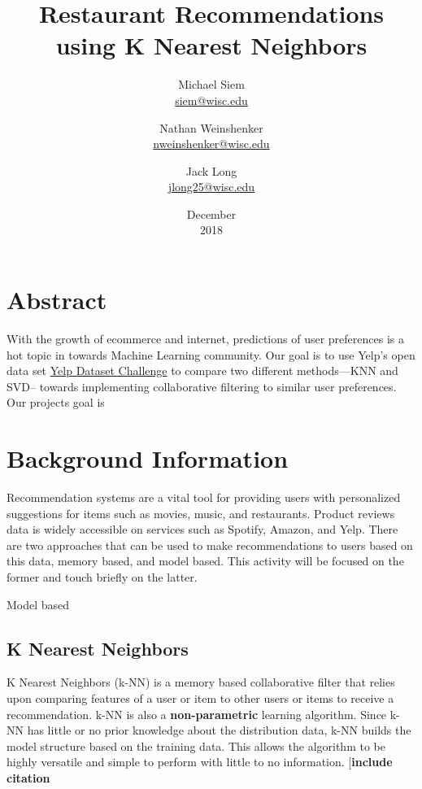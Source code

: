 \documentclass{report}
\title{Restaurant Recommendations using K Nearest Neighbors}
\date{December\\ 2018}
\author{Michael Siem \\ \href{mailto:siem@wisc.edu}{siem@wisc.edu}
	\and Nathan Weinshenker \\ \href{mailto:nweinshenker@wisc.edu}{nweinshenker@wisc.edu}
	\and Jack Long \\ \href{mailto:jlong25@wisc.edu}{jlong25@wisc.edu}}
\begin{document}
\maketitle

\section*{Abstract}
With the growth of ecommerce and internet, predictions of user preferences is a hot topic in towards Machine Learning community. Our goal is to use Yelp's open data set \href {https://www.yelp.com/dataset/challenge} {Yelp Dataset Challenge} to compare two different methods—KNN and SVD-- towards implementing collaborative filtering to similar user preferences.  Our projects goal is 


\section*{Background Information}

Recommendation systems are a vital tool for providing users with personalized suggestions for items such as movies, music, and restaurants.
Product reviews data is widely accessible on services such as Spotify, Amazon, and Yelp.
There are two approaches that can be used to make recommendations to users based on this data, memory based, and model based. This activity will be focused on the former and touch briefly on the latter.

Model based 
	
\subsection*{K Nearest Neighbors}
	
K Nearest Neighbors (k-NN) is a memory based collaborative filter that relies upon comparing features of a user or item to other users or items to receive a recommendation. 
k-NN is also a \textbf{non-parametric} learning algorithm. Since k-NN has little or no prior knowledge about the distribution data, k-NN  builds the model structure based on the training data. This allows the algorithm to be highly versatile and simple to perform with little to no information. [\textbf{include citation}
\end{document}
